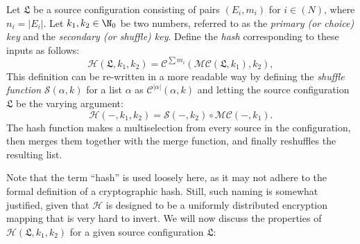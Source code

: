 \documentclass[12pt, a4paper]{article}
\newcommand{\C}{\mathcal{C}}
\renewcommand{\H}{\mathcal{H}}
\renewcommand{\S}{\mathcal{S}}
\newcommand{\M}{\mathcal{M}}
\newcommand{\conf}{\mathfrak{L}}
\begin{document}
\begin{definition}
    Let $ \conf $ be a source configuration consisting of pairs $ (E_i, m_i) $ for $ i \in (N) $, where $ n_i = |E_i| $. Let $ k_1, k_2 \in \N_0 $ be two numbers, referred to as the \emph{primary (or choice) key} and the \emph{secondary (or shuffle) key}. Define the \emph{hash} corresponding to these inputs as follows:
    \[ \H(\conf, k_1, k_2) = \C^{\sum m_i}\left(\M\C(\conf, k_1), k_2\right), \]
    This definition can be re-written in a more readable way by defining the \emph{shuffle function} $ \S(\alpha, k) $ for a list $ \alpha $ as $ \C^{|\alpha|}(\alpha, k) $ and letting the source configuration $ \conf $ be the varying argument:
    \[ \H(-, k_1, k_2) = \S(-, k_2) \circ \M\C(-, k_1). \]
    The hash function makes a multiselection from every source in the configuration, then merges them together with the merge function, and finally reshuffles the resulting list.
\end{definition}

Note that the term ``hash'' is used loosely here, as it may not adhere to the formal definition of a cryptographic hash. Still, such naming is somewhat justified, given that $ \H $ is designed to be a uniformly distributed encryption mapping that is very hard to invert. We will now discuss the properties of $ \H(\conf, k_1, k_2) $ for a given source configuration $ \conf $:
\end{document}

